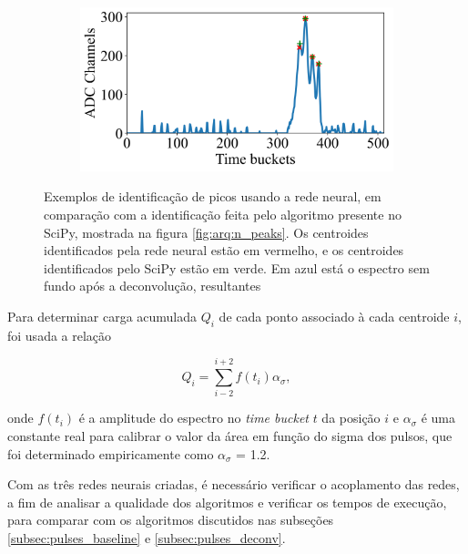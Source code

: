 \documentclass[a4paper,12pt,oneside]{book}
\begin{document}
\begin{figure}[H]
\begin{subfigure}[b]{0.49\textwidth}
        \caption{}
        \label{subfig:exs_n_peaks_3}
    \end{subfigure}%
    \hfill
    \begin{subfigure}[b]{0.465\textwidth}
        \centering
        \includegraphics[scale=0.425]{figs/np_exs4.png}
        \caption{}
        \label{subfig:exs_n_peaks_4}
    \end{subfigure}
\caption{Exemplos de identificação de picos usando a rede neural, em comparação com a identificação feita pelo algoritmo presente no SciPy, mostrada na figura \ref{fig:arq:n_peaks}. Os centroides identificados pela rede neural estão em vermelho, e os centroides identificados pelo SciPy estão em verde. Em azul está o espectro sem fundo após a deconvolução, resultantes }
\label{fig:exs_n_peaks}
\end{figure}

\par Para determinar carga acumulada $Q_i$ de cada ponto associado à cada centroide $i$, foi usada a relação

\begin{equation}\label{eq:carga_acumulada_ml}
	Q_i = \sum_{i - 2}^{i + 2}f(t_i)\alpha_\sigma,
\end{equation}

\par onde $f(t_i)$ é a amplitude do espectro no \textit{time bucket} $t$ da posição $i$ e $\alpha_\sigma$ é uma constante real para calibrar o valor da área em função do sigma dos pulsos, que foi determinado empiricamente como $\alpha_\sigma$ = 1.2.

\par Com as três redes neurais criadas, é necessário verificar o acoplamento das redes, a fim de analisar a qualidade dos algoritmos e verificar os tempos de execução, para comparar com os algoritmos discutidos nas subseções \ref{subsec:pulses_baseline} e \ref{subsec:pulses_deconv}.
\end{document}
